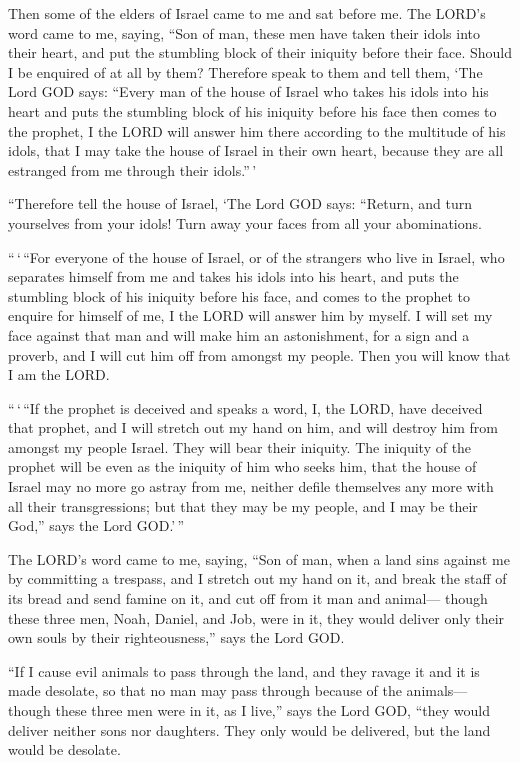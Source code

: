  Then some of the elders of Israel came to me and sat before
me.  The LORD's word came to me, saying,  ``Son
of man, these men have taken their idols into their heart, and put the
stumbling block of their iniquity before their face. Should I be
enquired of at all by them?  Therefore speak to them and
tell them, `The Lord GOD says: ``Every man of the house of Israel who
takes his idols into his heart and puts the stumbling block of his
iniquity before his face then comes to the prophet, I the LORD will
answer him there according to the multitude of his idols, 
that I may take the house of Israel in their own heart, because they are
all estranged from me through their idols.''\,'

 ``Therefore tell the house of Israel, `The Lord GOD says:
``Return, and turn yourselves from your idols! Turn away your faces from
all your abominations.

 ``\,`\,``For everyone of the house of Israel, or of the
strangers who live in Israel, who separates himself from me and takes
his idols into his heart, and puts the stumbling block of his iniquity
before his face, and comes to the prophet to enquire for himself of me,
I the LORD will answer him by myself.  I will set my face
against that man and will make him an astonishment, for a sign and a
proverb, and I will cut him off from amongst my people. Then you will
know that I am the LORD.

 ``\,`\,``If the prophet is deceived and speaks a word, I,
the LORD, have deceived that prophet, and I will stretch out my hand on
him, and will destroy him from amongst my people Israel. 
They will bear their iniquity. The iniquity of the prophet will be even
as the iniquity of him who seeks him,  that the house of
Israel may no more go astray from me, neither defile themselves any more
with all their transgressions; but that they may be my people, and I may
be their God,'' says the Lord GOD.'\,''

 The LORD's word came to me, saying,  ``Son of
man, when a land sins against me by committing a trespass, and I stretch
out my hand on it, and break the staff of its bread and send famine on
it, and cut off from it man and animal---  though these
three men, Noah, Daniel, and Job, were in it, they would deliver only
their own souls by their righteousness,'' says the Lord GOD.

 ``If I cause evil animals to pass through the land, and
they ravage it and it is made desolate, so that no man may pass through
because of the animals---  though these three men were in
it, as I live,'' says the Lord GOD, ``they would deliver neither sons
nor daughters. They only would be delivered, but the land would be
desolate.


